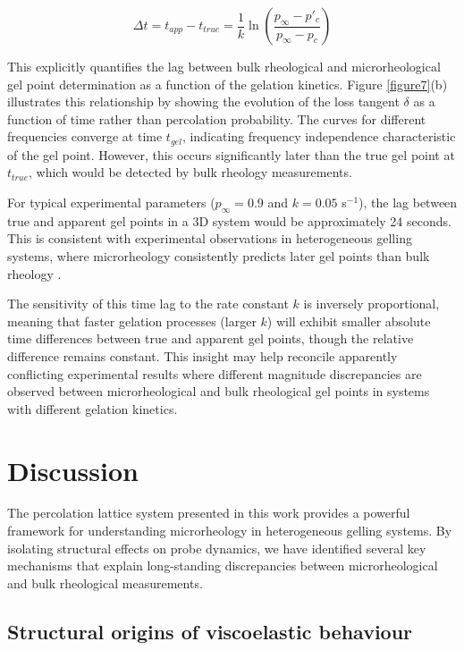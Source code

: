 \documentclass[%
 aip,
 amsmath,amssymb,
reprint, onecolumn %
]{revtex4-1}
\begin{document}
\begin{equation}\label{eqn:delta_t}
\Delta t = t_{app} - t_{true} = \frac{1}{k}\ln\left(\frac{p_\infty-p'_c}{p_\infty-p_c}\right)
\end{equation}

This explicitly quantifies the lag between bulk rheological and microrheological gel point determination as a function of the gelation kinetics. Figure \ref{figure7}(b) illustrates this relationship by showing the evolution of the loss tangent $\delta$ as a function of time rather than percolation probability. The curves for different frequencies converge at time $t_{gel}$, indicating frequency independence characteristic of the gel point. However, this occurs significantly later than the true gel point at $t_{true}$, which would be detected by bulk rheology measurements.


For typical experimental parameters ($p_\infty = 0.9$ and $k = 0.05$ s$^{-1}$), the lag between true and apparent gel points in a 3D system would be approximately 24 seconds. This is consistent with experimental observations in heterogeneous gelling systems, where microrheology consistently predicts later gel points than bulk rheology \cite{Rich2011, Oppong2006}.

The sensitivity of this time lag to the rate constant $k$ is inversely proportional, meaning that faster gelation processes (larger $k$) will exhibit smaller absolute time differences between true and apparent gel points, though the relative difference remains constant. This insight may help reconcile apparently conflicting experimental results where different magnitude discrepancies are observed between microrheological and bulk rheological gel points in systems with different gelation kinetics.


\section{Discussion}

The percolation lattice system presented in this work provides a powerful framework for understanding microrheology in heterogeneous gelling systems. By isolating structural effects on probe dynamics, we have identified several key mechanisms that explain long-standing discrepancies between microrheological and bulk rheological measurements.

\subsection{Structural origins of viscoelastic behaviour}
\end{document}
